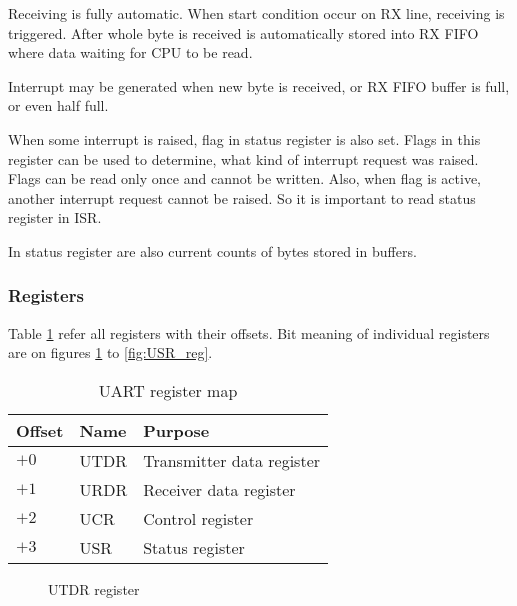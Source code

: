 Receiving is fully automatic. When start condition occur on RX line, receiving is
triggered. After whole byte is received is automatically stored into RX FIFO where
data waiting for CPU to be read.

Interrupt may be generated when new byte is received, or RX FIFO buffer is full, or even
half full.

When some interrupt is raised, flag in status register is also set. Flags in this
register can be used to determine, what kind of interrupt request was raised. Flags
can be read only once and cannot be written. Also, when flag is active, another interrupt
request cannot be raised. So it is important to read status register in ISR.

In status register are also current counts of bytes stored in buffers.

\subsubsection{Registers}
\label{sec:peripherals_uart_reg}

Table \ref{tab:uart_reg_map} refer all registers with their offsets. Bit meaning
of individual registers are on figures \ref{fig:UTDR_reg} to \ref{fig:USR_reg}.

\begin{table}[H]
    \centering
    \begin{tabular}{|l|l|l|}
        \hline
        \textbf{Offset} & \textbf{Name} & \textbf{Purpose}           \\ \hline
        $+0$            & UTDR          & Transmitter data register  \\ \hline
        $+1$            & URDR          & Receiver data register     \\ \hline
        $+2$            & UCR           & Control register           \\ \hline
        $+3$            & USR           & Status register            \\ \hline
    \end{tabular}
    \caption{UART register map}
    \label{tab:uart_reg_map}
\end{table}

\begin{figure}[H]
    \centering
    \caption{UTDR register}
    \label{fig:UTDR_reg}
\end{figure}

